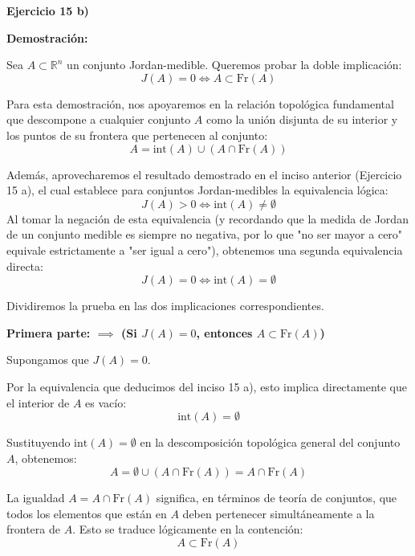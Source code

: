 \documentclass[11pt,letterpaper]{article}
\begin{document}
\textbf{Ejercicio 15 b)}

\textbf{Demostración:}

Sea $A \subset \mathbb{R}^n$ un conjunto Jordan-medible. Queremos probar la doble implicación:
\begin{equation*}
J(A) = 0 \iff A \subset \text{Fr}(A)
\end{equation*}

Para esta demostración, nos apoyaremos en la relación topológica fundamental que descompone a cualquier conjunto $A$ como la unión disjunta de su interior y los puntos de su frontera que pertenecen al conjunto:
\begin{equation*}
A = \text{int}(A) \cup (A \cap \text{Fr}(A))
\end{equation*}

Además, aprovecharemos el resultado demostrado en el inciso anterior (Ejercicio 15 a), el cual establece para conjuntos Jordan-medibles la equivalencia lógica:
\begin{equation*}
J(A) > 0 \iff \text{int}(A) \neq \emptyset
\end{equation*}
Al tomar la negación de esta equivalencia (y recordando que la medida de Jordan de un conjunto medible es siempre no negativa, por lo que "no ser mayor a cero" equivale estrictamente a "ser igual a cero"), obtenemos una segunda equivalencia directa:
\begin{equation*}
J(A) = 0 \iff \text{int}(A) = \emptyset
\end{equation*}

Dividiremos la prueba en las dos implicaciones correspondientes.

\vspace{0.5cm}
\textbf{Primera parte: $\implies$ (Si $J(A) = 0$, entonces $A \subset \text{Fr}(A)$)}

Supongamos que $J(A) = 0$. 

Por la equivalencia que deducimos del inciso 15 a), esto implica directamente que el interior de $A$ es vacío:
\begin{equation*}
\text{int}(A) = \emptyset
\end{equation*}

Sustituyendo $\text{int}(A) = \emptyset$ en la descomposición topológica general del conjunto $A$, obtenemos:
\begin{equation*}
A = \emptyset \cup (A \cap \text{Fr}(A)) = A \cap \text{Fr}(A)
\end{equation*}

La igualdad $A = A \cap \text{Fr}(A)$ significa, en términos de teoría de conjuntos, que todos los elementos que están en $A$ deben pertenecer simultáneamente a la frontera de $A$. Esto se traduce lógicamente en la contención:
\begin{equation*}
A \subset \text{Fr}(A)
\end{equation*}
\end{document}

